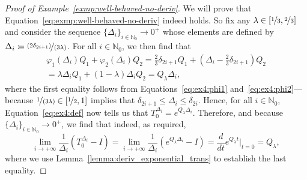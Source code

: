 \documentclass[10pt,a4paper]{paper}
\theoremstyle{definition}
\newcommand{\nats}{\mathbb{N}}
\newcommand{\coloneqq}{:\!=}
\begin{document}
\begin{proof}[Proof of Example~\ref{exmp:well-behaved-no-deriv}]
We will prove that Equation~\eqref{eq:exmp:well-behaved-no-deriv} indeed holds. So fix any $\lambda\in[\nicefrac{1}{3},\nicefrac{2}{3}]$ and consider the sequence $\{\Delta_i\}_{i\in\nats_0}\to0^+$ whose elements are defined by \mbox{$\Delta_i\coloneqq\nicefrac{(2\delta_{2i+1})}{(3\lambda)}$}. For all $i\in\nats_0$, we then find that
\begin{multline*}
\varphi_1(\Delta_i)Q_1+\varphi_2(\Delta_i)Q_2
=\frac{2}{3}\delta_{2i+1}Q_1+(\Delta_i-\frac{2}{3}\delta_{2i+1})Q_2\\
=\lambda\Delta_i Q_1+(1-\lambda)\Delta_i Q_2
=Q_\lambda \Delta_i,
\end{multline*}
where the first equality follows from Equations~\eqref{eq:ex4:phi1} and~\eqref{eq:ex4:phi2}---because $\nicefrac{1}{(3\lambda)}\in[\nicefrac{1}{2},1]$ implies that $\delta_{2i+1}\leq\Delta_i\leq\delta_{2i}$.
Hence, for all $i\in\nats_0$, Equation~\eqref{eq:ex4:def} now tells us that $T_0^{\Delta_i}=e^{Q_\lambda\Delta_i}$.
Therefore, and because $\{\Delta_{i}\}_{i\in\nats_0}\to0^+$, we find that indeed, as required,
\begin{equation}\label{eq:exmp:well-behaved-no-deriv2}
\lim_{i\to+\infty}
\frac{1}{\Delta_i}
(T^{\Delta_i}_{0}-I)
=
\lim_{i\to+\infty}
\frac{1}{\Delta_{i}}
(e^{Q_\lambda\Delta_{i}}-I)
={\frac{d}{dt}e^{Q_\lambda t}}\big\vert_{t=0}
=Q_\lambda,
\end{equation}
where we use Lemma~\ref{lemma:deriv_exponential_trans} to establish the last equality. 
\end{proof}
\end{document}
